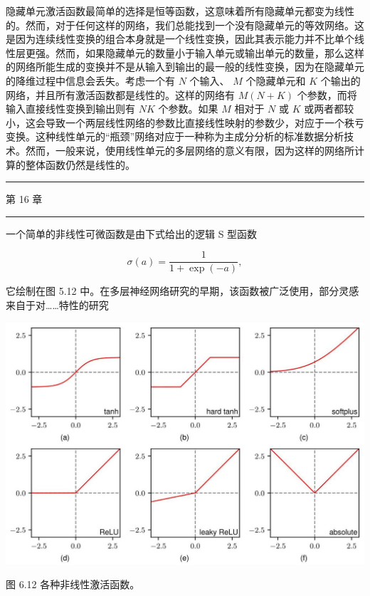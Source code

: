 \documentclass[10pt]{report}
\newcommand{\HRule}{\begin{center}\rule{0.9\linewidth}{0.2mm}\end{center}}
\begin{document}
隐藏单元激活函数最简单的选择是恒等函数，这意味着所有隐藏单元都变为线性的。然而，对于任何这样的网络，我们总能找到一个没有隐藏单元的等效网络。这是因为连续线性变换的组合本身就是一个线性变换，因此其表示能力并不比单个线性层更强。然而，如果隐藏单元的数量小于输入单元或输出单元的数量，那么这样的网络所能生成的变换并不是从输入到输出的最一般的线性变换，因为在隐藏单元的降维过程中信息会丢失。考虑一个有 \(N\) 个输入、 \(M\) 个隐藏单元和 \(K\) 个输出的网络，并且所有激活函数都是线性的。这样的网络有 \(M\left( {N + K}\right)\) 个参数，而将输入直接线性变换到输出则有 \({NK}\) 个参数。如果 \(M\) 相对于 \(N\) 或 \(K\) 或两者都较小，这会导致一个两层线性网络的参数比直接线性映射的参数少，对应于一个秩亏变换。这种线性单元的“瓶颈”网络对应于一种称为主成分分析的标准数据分析技术。然而，一般来说，使用线性单元的多层网络的意义有限，因为这样的网络所计算的整体函数仍然是线性的。

\HRule

第 16 章

\HRule

一个简单的非线性可微函数是由下式给出的逻辑 S 型函数

\[
\sigma \left( a\right)  = \frac{1}{1 + \exp \left( {-a}\right) }, \tag{6.13}
\]

它绘制在图 5.12 中。在多层神经网络研究的早期，该函数被广泛使用，部分灵感来自于对……特性的研究

\begin{center}
\includegraphics[max width=1.0\textwidth]{images/0194e279-9b28-703a-88f4-c3ac21e2010d_203_243_340_1303_880_0.jpg}
\end{center}
\hspace*{3em} 

图 6.12 各种非线性激活函数。
\end{document}
